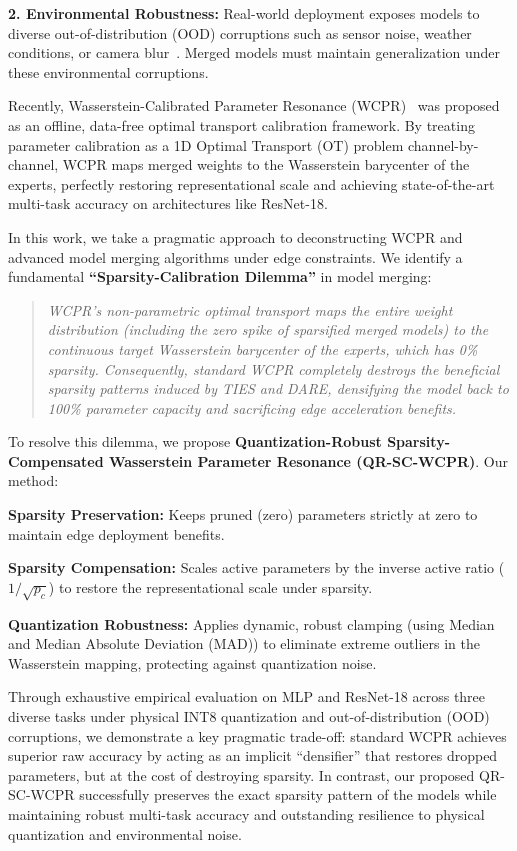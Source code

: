 \documentclass{article}
\theoremstyle{plain}
\theoremstyle{definition}
\theoremstyle{remark}
\begin{document}
\textbf{2. Environmental Robustness:} Real-world deployment exposes models to diverse out-of-distribution (OOD) corruptions such as sensor noise, weather conditions, or camera blur~\cite{hendrycks19corruptions, mu20mnistc}. Merged models must maintain generalization under these environmental corruptions.

Recently, Wasserstein-Calibrated Parameter Resonance (WCPR)~\cite{submission9} was proposed as an offline, data-free optimal transport calibration framework. By treating parameter calibration as a 1D Optimal Transport (OT) problem channel-by-channel, WCPR maps merged weights to the Wasserstein barycenter of the experts, perfectly restoring representational scale and achieving state-of-the-art multi-task accuracy on architectures like ResNet-18.

In this work, we take a pragmatic approach to deconstructing WCPR and advanced model merging algorithms under edge constraints. We identify a fundamental \textbf{``Sparsity-Calibration Dilemma''} in model merging:
\begin{quote}
    \textit{WCPR's non-parametric optimal transport maps the entire weight distribution (including the zero spike of sparsified merged models) to the continuous target Wasserstein barycenter of the experts, which has 0\% sparsity. Consequently, standard WCPR completely destroys the beneficial sparsity patterns induced by TIES and DARE, densifying the model back to 100\% parameter capacity and sacrificing edge acceleration benefits.}
\end{quote}

To resolve this dilemma, we propose \textbf{Quantization-Robust Sparsity-Compensated Wasserstein Parameter Resonance (QR-SC-WCPR)}. Our method:

\textbf{Sparsity Preservation:} Keeps pruned (zero) parameters strictly at zero to maintain edge deployment benefits.

\textbf{Sparsity Compensation:} Scales active parameters by the inverse active ratio ($1/\sqrt{p_c}$) to restore the representational scale under sparsity.

\textbf{Quantization Robustness:} Applies dynamic, robust clamping (using Median and Median Absolute Deviation (MAD)) to eliminate extreme outliers in the Wasserstein mapping, protecting against quantization noise.

Through exhaustive empirical evaluation on MLP and ResNet-18 across three diverse tasks under physical INT8 quantization and out-of-distribution (OOD) corruptions, we demonstrate a key pragmatic trade-off: standard WCPR achieves superior raw accuracy by acting as an implicit ``densifier'' that restores dropped parameters, but at the cost of destroying sparsity. In contrast, our proposed QR-SC-WCPR successfully preserves the exact sparsity pattern of the models while maintaining robust multi-task accuracy and outstanding resilience to physical quantization and environmental noise.
\end{document}
